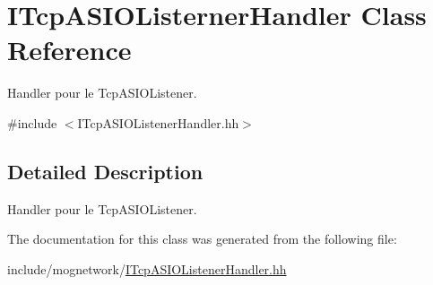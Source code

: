 \hypertarget{class_i_tcp_a_s_i_o_listerner_handler}{\section{I\-Tcp\-A\-S\-I\-O\-Listerner\-Handler Class Reference}
\label{class_i_tcp_a_s_i_o_listerner_handler}
}


Handler pour le Tcp\-A\-S\-I\-O\-Listener.  




{\ttfamily \#include $<$I\-Tcp\-A\-S\-I\-O\-Listener\-Handler.\-hh$>$}



\subsection{Detailed Description}
Handler pour le Tcp\-A\-S\-I\-O\-Listener. 

The documentation for this class was generated from the following file\-:\begin{DoxyCompactItemize}
\item 
include/mognetwork/\hyperlink{_i_tcp_a_s_i_o_listener_handler_8hh}{I\-Tcp\-A\-S\-I\-O\-Listener\-Handler.\-hh}\end{DoxyCompactItemize}
